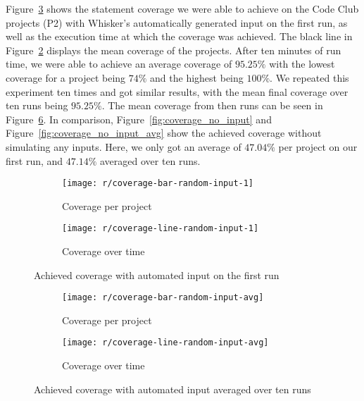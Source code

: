 \noindent Figure~\ref{fig:coverage} shows the statement coverage we were able to achieve on the Code Club projects (P2)
with Whisker's automatically generated input on the first run,
as well as the execution time at which the coverage was achieved.
The black line in Figure~\ref{fig:coverage_line} displays the mean coverage of the projects.
After ten minutes of run time, we were able to achieve an average coverage of $95.25\%$ with the lowest coverage for a project being $74\%$ and the highest being $100\%$.
We repeated this experiment ten times and got similar results, with the mean final coverage over ten runs being $95.25\%$.
The mean coverage from then runs can be seen in Figure~\ref{fig:coverage_avg}.
In comparison, Figure~\ref{fig:coverage_no_input} and Figure~\ref{fig:coverage_no_input_avg} show the achieved coverage without simulating any inputs.
Here, we only got an average of $47.04\%$ per project on our first run, and $47.14\%$ averaged over ten runs.
\parspace

\begin{figure}[htpb]
    \centering
    \begin{subfigure}{.95\textwidth}
        \texttt{[image: r/coverage-bar-random-input-1]}
        \caption{Coverage per project}
        \label{fig:coverage_bar}
    \end{subfigure}

    \bigskip

    \begin{subfigure}{.95\textwidth}
        \texttt{[image: r/coverage-line-random-input-1]}
        \caption{Coverage over time}
        \label{fig:coverage_line}
    \end{subfigure}

    \caption{Achieved coverage with automated input on the first run}
    \label{fig:coverage}
\end{figure}

\begin{figure}[htpb]
    \centering
    \begin{subfigure}{.95\textwidth}
        \texttt{[image: r/coverage-bar-random-input-avg]}
        \caption{Coverage per project}
        \label{fig:coverage_bar_avg}
    \end{subfigure}

    \bigskip

    \begin{subfigure}{.95\textwidth}
        \texttt{[image: r/coverage-line-random-input-avg]}
        \caption{Coverage over time}
        \label{fig:coverage_line_avg}
    \end{subfigure}

    \caption{Achieved coverage with automated input averaged over ten runs}
    \label{fig:coverage_avg}
\end{figure}

